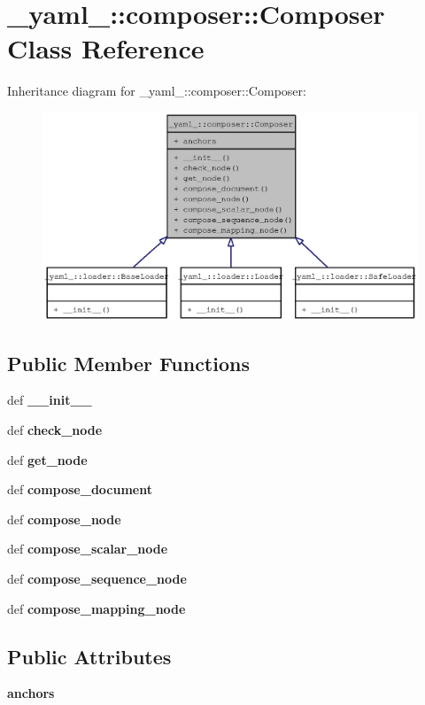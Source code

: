 \section{\_\-yaml\_\-::composer::Composer Class Reference}
\label{class__yaml___1_1composer_1_1Composer}
Inheritance diagram for \_\-yaml\_\-::composer::Composer:\nopagebreak
\begin{figure}[H]
\begin{center}
\leavevmode
\includegraphics[width=400pt]{class__yaml___1_1composer_1_1Composer__inherit__graph}
\end{center}
\end{figure}
\subsection*{Public Member Functions}
\begin{CompactItemize}
\item 
def {\bf \_\-\_\-init\_\-\_\-}
\item 
def {\bf check\_\-node}
\item 
def {\bf get\_\-node}
\item 
def {\bf compose\_\-document}
\item 
def {\bf compose\_\-node}
\item 
def {\bf compose\_\-scalar\_\-node}
\item 
def {\bf compose\_\-sequence\_\-node}
\item 
def {\bf compose\_\-mapping\_\-node}
\end{CompactItemize}
\subsection*{Public Attributes}
\begin{CompactItemize}
\item 
{\bf anchors}
\end{CompactItemize}


